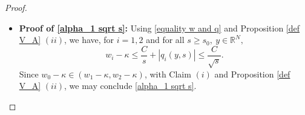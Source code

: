 \documentclass[11pt,a4paper]{article}
\newcommand{\1}{\mathbbm{1}}
\numberwithin{equation}{section}
\newcommand{\numberset}{\mathbb}
\newcommand{\R}{\numberset{R}}
\theoremstyle{remark}
\begin{document}
\begin{proof}
\begin{itemize}
Again from Proposition \ref{def V_A}, we obtain
\begin{equation}\label{bound q_e}
\|q_{i,e}(s)\|_{L^\infty(\R^N)}\leq \frac{A^2}{\sqrt{s}}.
\end{equation}
Since we have $supp\ q_{e,i}=\{(y,s), |y|\geq 2K_0\sqrt{s}\}$, then 
\begin{equation}\label{q_ei}
|q_{i,e}(y,s)|\leq \frac{(Ay)^2}{4K_0^2s^\frac{3}{2}}.
\end{equation}
Then, 
\begin{equation}\label{control q_i}
|q_i(y,s)|\leq CA^2\frac{1+|y|^2}{s^{3/2}}.
\end{equation}

Since we have $|w_0-\kappa|\leq \max(|w_1-\kappa|,|w_2-\kappa|)$ from Lemma \ref{bound w}, therefore,
\begin{equation}\label{bound w-kappa}
|w_0-\kappa|\leq C \frac{1+|y|^2}{s}.
\end{equation}

Together with Claim $(i)$, we obtain \eqref{estimation alpha_1 1}.


\item \textbf{Proof of \eqref{alpha_1 sqrt s}: }Using \eqref{equality w and q} and Proposition \ref{def V_A} $(ii)$, we have, for $i=1,2$ and for all $s\geq s_0,\ y\in \R^N,$
$$w_i-\kappa\leq \frac{C}{s}+|q_i(y,s)|\leq \frac{C}{\sqrt{s}}.$$
Since $w_0-\kappa\in (w_1-\kappa,w_2-\kappa)$, with Claim $(i)$ and Proposition \ref{def V_A} $(ii)$, we may conclude \eqref{alpha_1 sqrt s}.


\end{itemize}
\end{proof}
\end{document}
